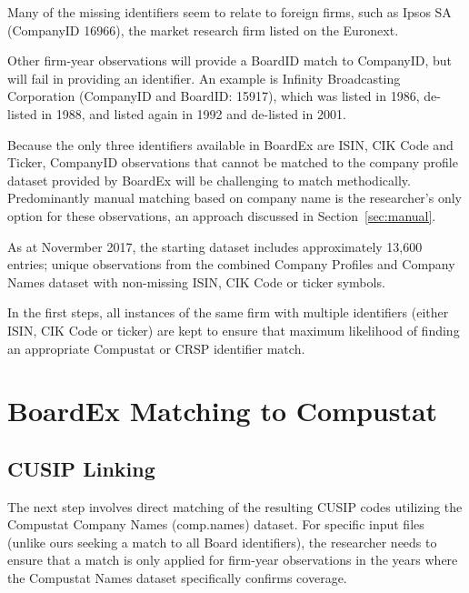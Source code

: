 \documentclass[12pt]{article}
\begin{document}
Many of the missing identifiers seem to relate to foreign firms, such as Ipsos SA (CompanyID 16966), the market research firm listed on the Euronext.

Other firm-year observations will provide a BoardID match to CompanyID, but will fail in providing an identifier.
An example is Infinity Broadcasting Corporation (CompanyID and BoardID: 15917), which was listed in 1986, de-listed in 1988, and listed again in 1992 and de-listed in 2001.

\begin{center}

\end{center}

Because the only three identifiers available in BoardEx are ISIN, CIK Code and Ticker, CompanyID observations that cannot be matched to the company profile dataset provided by BoardEx will be challenging to match methodically.
Predominantly manual matching based on company name is the researcher's only option for these observations, an approach discussed in Section~\ref{sec:manual}.

As at Novermber 2017, the starting dataset includes approximately 13,600 entries; unique observations from the combined Company Profiles and Company Names dataset with non-missing ISIN, CIK Code or ticker symbols.

In the first steps, all instances of the same firm with multiple identifiers (either ISIN, CIK Code or ticker) are kept to ensure that maximum likelihood of finding an appropriate Compustat or CRSP identifier match.


\section{BoardEx Matching to Compustat}\label{sec:BoardexCOMP}

\subsection{CUSIP Linking}\label{sec:CUSIPmatch}

The next step involves direct matching of the resulting CUSIP codes utilizing the Compustat Company Names (comp.names) dataset.
For specific input files (unlike ours seeking a match to all Board identifiers), the researcher needs to ensure that a match is only applied for firm-year observations in the years where the Compustat Names dataset specifically confirms coverage.
\end{document}
